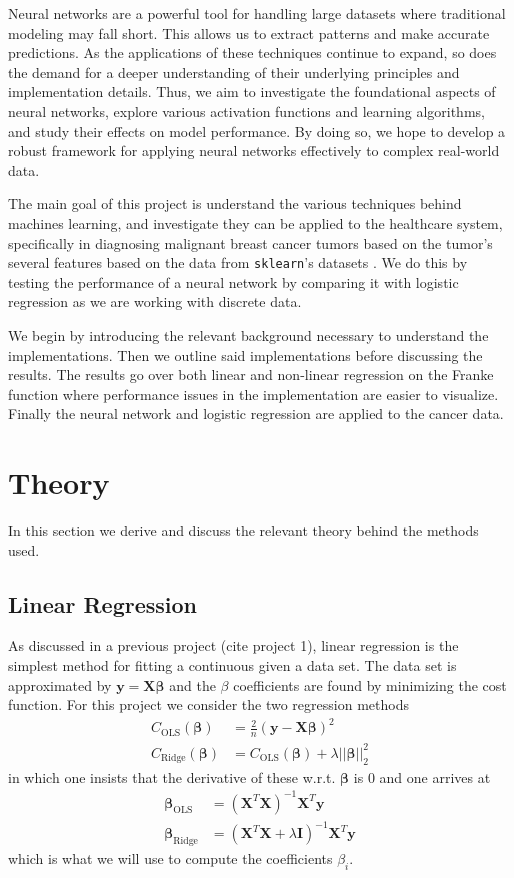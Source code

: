 \documentclass[%
reprint,
amsmath,amssymb,
aps,
]{revtex4-2}
\begin{document}
Neural networks are a powerful tool for handling large datasets where traditional modeling may fall short. This allows us to extract patterns and make accurate predictions. As the applications of these techniques continue to expand, so does the demand for a deeper understanding of their underlying principles and implementation details. Thus, we aim to investigate the foundational aspects of neural networks, explore various activation functions and learning algorithms, and study their effects on model performance. By doing so, we hope to develop a robust framework for applying neural networks effectively to complex real-world data.

The main goal of this project is understand the various techniques behind machines learning, and investigate they can be applied to the healthcare system, specifically in diagnosing malignant breast cancer tumors based on the tumor's several features based on the data from \texttt{sklearn}'s datasets \cite{sklearn}. We do this by testing the performance of a neural network by comparing it with logistic regression as we are working with discrete data. 

We begin by introducing the relevant background necessary to understand the implementations. Then we outline said implementations before discussing the results. The results go over both linear and non-linear regression on the Franke function where performance issues in the implementation are easier to visualize. Finally the neural network and logistic regression are applied to the cancer data. 

\section{Theory}
In this section we derive and discuss the relevant theory behind the methods used. 

\subsection{Linear Regression}
As discussed in a previous project (cite project 1), linear regression is the simplest method for fitting a continuous given a data set. The data set is approximated by $\bm y=\bm X\bm\beta$ and the $\beta$ coefficients are found by minimizing the cost function. For this project we consider the two regression methods
\begin{align}
	C_\text{OLS}(\bm\beta)&=\frac{2}{n}(\bm y-\bm X\bm\beta)^2\\
	C_\text{Ridge}(\bm\beta)&=C_\text{OLS}(\bm\beta)+\lambda||\bm\beta||_2^2
\end{align}
in which one insists that the derivative of these w.r.t. $\bm\beta$ is $0$ and one arrives at
\begin{align}
	\bm\beta_\text{OLS}&=(\bm X^T\bm X)^{-1}\bm X^T\bm y\\
	\bm\beta_\text{Ridge}&=(\bm X^T\bm X+\lambda \bm I)^{-1}\bm X^T\bm y
\end{align}
which is what we will use to compute the coefficients $\beta_i$.
\end{document}
